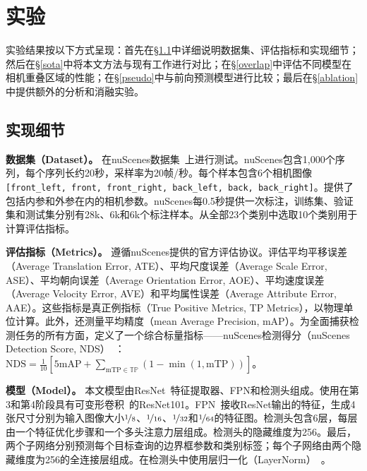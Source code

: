 \section{实验}
实验结果按以下方式呈现：首先在\S\ref{detail}中详细说明数据集、评估指标和实现细节；然后在\S\ref{sota}中将本文方法与现有工作进行对比；在\S\ref{overlap}中评估不同模型在相机重叠区域的性能；在\S\ref{pseudo}中与前向预测模型进行比较；最后在\S\ref{ablation}中提供额外的分析和消融实验。

\subsection{实现细节}
\label{detail}

\textbf{数据集（Dataset）。} 在nuScenes数据集~\cite{nuscenes2019}上进行测试。nuScenes包含1,000个序列，每个序列长约20秒，采样率为20帧/秒。每个样本包含6个相机图像 \texttt{[front\_left, front, front\_right, back\_left, back, back\_right]}。提供了包括内参和外参在内的相机参数。nuScenes每0.5秒提供一次标注，训练集、验证集和测试集分别有28k、6k和6k个标注样本。从全部23个类别中选取10个类别用于计算评估指标。

\textbf{评估指标（Metrics）。} 遵循nuScenes提供的官方评估协议。评估平均平移误差（Average Translation Error, ATE）、平均尺度误差（Average Scale Error, ASE）、平均朝向误差（Average Orientation Error, AOE）、平均速度误差（Average Velocity Error, AVE）和平均属性误差（Average Attribute Error, AAE）。这些指标是真正例指标（True Positive Metrics, TP Metrics），以物理单位计算。此外，还测量平均精度（mean Average Precision, mAP）。为全面捕获检测任务的所有方面，定义了一个综合标量指标——nuScenes检测得分（nuScenes Detection Score, NDS）~\cite{nuscenes2019}：$\mathrm{NDS} = \frac{1}{10}[5\mathrm{mAP}+\sum_{\mathrm{mTP}\in \mathbb{TP}}(1-\min(1, \mathrm{mTP}))]$。

\textbf{模型（Model）。} 本文模型由ResNet~\cite{He2015}特征提取器、FPN和\name 检测头组成。使用在第3和第4阶段具有可变形卷积~\cite{dai17dcn}的ResNet101。FPN~\cite{Lin2017}接收ResNet输出的特征，生成4张尺寸分别为输入图像大小$\nicefrac18$、$\nicefrac1{16}$、$\nicefrac1{32}$和$\nicefrac1{64}$的特征图。\name 检测头包含6层，每层由一个特征优化步骤和一个多头注意力层组成。\name 检测头的隐藏维度为256。最后，两个子网络分别预测每个目标查询的边界框参数和类别标签；每个子网络由两个隐藏维度为256的全连接层组成。在检测头中使用层归一化（LayerNorm）~\cite{BaKH16}。

